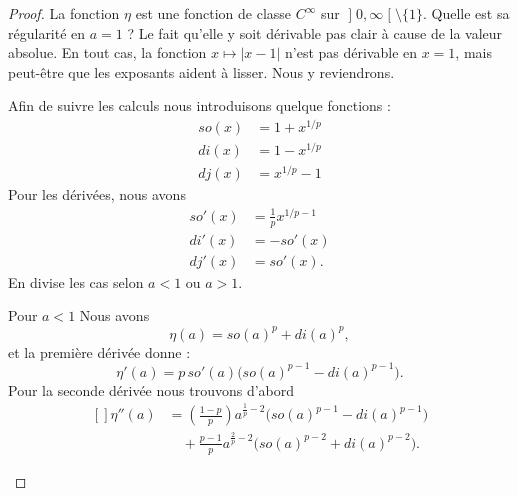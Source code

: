 \begin{proof}
    La fonction \( \eta\) est une fonction de classe \(  C^{\infty}\) sur \( \mathopen] 0 , \infty \mathclose[\setminus\{ 1 \}\). Quelle est sa régularité en \( a=1\) ? Le fait qu'elle y soit dérivable pas clair à cause de la valeur absolue. En tout cas, la fonction \( x\mapsto| x-1 |\) n'est pas dérivable en \( x=1\), mais peut-être que les exposants aident à lisser. Nous y reviendrons.

    Afin de  suivre les calculs nous introduisons quelque fonctions :
    \begin{subequations}
        \begin{align}
            so(x)&=1+x^{1/p}\\
            di(x)&=1-x^{1/p}\\
            dj(x)&=x^{1/p}-1
        \end{align}
    \end{subequations}
    Pour les dérivées, nous avons
    \begin{subequations}
        \begin{align}
            so'(x)&=\frac{1}{ p }x^{1/p-1}\\
            di'(x)&=-so'(x)\\
            dj'(x)&=so'(x).
        \end{align}
    \end{subequations}
    En divise les cas selon \( a<1\) ou \( a>1\).
    \begin{subproof}
    \item[Pour \( a<1\)]
        Nous avons
        \begin{equation}
            \eta(a)=so(a)^p+di(a)^p,
        \end{equation}
        et la première dérivée donne :
        \begin{equation}        \label{EQooCLXZooXClOwd}
            \eta'(a)=p\,so'(a)\big( so(a)^{p-1}-di(a)^{p-1} \big).
        \end{equation}
        Pour la seconde dérivée nous trouvons d'abord
        \begin{equation}
            \begin{aligned}[]
            \eta''(a)&=\left( \frac{ 1-p }{ p } \right)a^{\frac{ 1 }{ p }-2}\big( so(a)^{p-1}-di(a)^{p-1} \big)\\
            &\quad+\frac{ p-1 }{ p }a^{\frac{ 2 }{ p }-2}\big( so(a)^{p-2}+di(a)^{p-2} \big).
            \end{aligned}
        \end{equation}

\end{subproof}
\end{proof}
